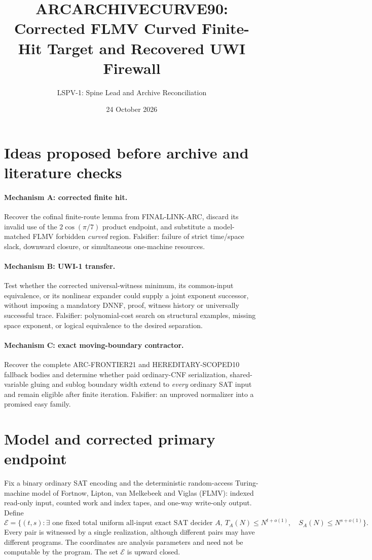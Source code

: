 \documentclass[11pt]{article}
\title{ARCARCHIVECURVE90: Corrected FLMV Curved Finite-Hit Target and Recovered UWI Firewall}
\author{LSPV-1: Spine Lead and Archive Reconciliation}
\date{24 October 2026}
\newcommand{\E}{\mathcal E}
\begin{document}
\maketitle
\begin{center}
\end{center}

\section{Ideas proposed before archive and literature checks}
\paragraph{Mechanism A: corrected finite hit.}
Recover the cofinal finite-route lemma from FINAL-LINK-ARC, discard its invalid use of the $2\cos(\pi/7)$ product endpoint, and substitute a model-matched FLMV forbidden \emph{curved} region. Falsifier: failure of strict time/space slack, downward closure, or simultaneous one-machine resources.
\paragraph{Mechanism B: UWI-1 transfer.}
Test whether the corrected universal-witness minimum, its common-input equivalence, or its nonlinear expander could supply a joint exponent successor, without imposing a mandatory DNNF, proof, witness history or universally successful trace. Falsifier: polynomial-cost search on structural examples, missing space exponent, or logical equivalence to the desired separation.
\paragraph{Mechanism C: exact moving-boundary contractor.}
Recover the complete ARC-FRONTIER21 and HEREDITARY-SCOPED10 fallback bodies and determine whether paid ordinary-CNF serialization, shared-variable gluing and sublog boundary width extend to \emph{every} ordinary SAT input and remain eligible after finite iteration. Falsifier: an unproved normalizer into a promised easy family.

\section{Model and corrected primary endpoint}
Fix a binary ordinary SAT encoding and the deterministic random-access Turing-machine model of Fortnow, Lipton, van Melkebeek and Viglas (FLMV): indexed read-only input, counted work and index tapes, and one-way write-only output. Define
\[
\E=\{(t,s):\exists\text{ one fixed total uniform all-input exact SAT decider }A,\
T_A(N)\le N^{t+o(1)},\quad S_A(N)\le N^{s+o(1)}\}.
\]
Every pair is witnessed by a single realization, although different pairs may have different programs. The coordinates are analysis parameters and need not be computable by the program. The set $\E$ is upward closed.
\end{document}
